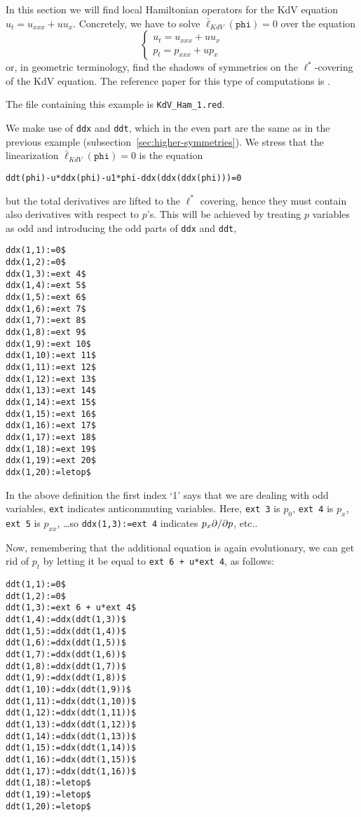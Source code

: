 In this section we will find local Hamiltonian operators for the KdV equation
$u_t=u_{xxx}+uu_x$. Concretely, we have to solve $\bar
\ell_{KdV}(\mathtt{phi})=0$ over the equation
\[
  \left\{\begin{array}{l}
    u_t=u_{xxx}+uu_x\\
    p_t=p_{xxx}+up_x
  \end{array}\right.
\]
or, in geometric terminology, find the shadows of symmetries on the
$\ell^*$-covering of the KdV equation. The reference paper for this type of
computations is \cite{KerstenKrasilshchikVerboretsky:2004}.

The file containing this example is \texttt{KdV\_Ham\_1.red}.

We make use of \texttt{ddx} and \texttt{ddt}, which in the even part are the
same as in the previous example (subsection~\ref{sec:higher-symmetries}).  We
stress that the linearization $\bar \ell_{KdV}(\mathtt{phi})=0$ is the equation
\begin{verbatim}
ddt(phi)-u*ddx(phi)-u1*phi-ddx(ddx(ddx(phi)))=0
\end{verbatim}
but the total derivatives are lifted to the $\ell^*$ covering, hence they must
contain also derivatives with respect to $p$'s. This will be achieved by
treating $p$ variables as odd and introducing the odd parts of \texttt{ddx} and
\texttt{ddt},
\begin{verbatim}
ddx(1,1):=0$
ddx(1,2):=0$
ddx(1,3):=ext 4$
ddx(1,4):=ext 5$
ddx(1,5):=ext 6$
ddx(1,6):=ext 7$
ddx(1,7):=ext 8$
ddx(1,8):=ext 9$
ddx(1,9):=ext 10$
ddx(1,10):=ext 11$
ddx(1,11):=ext 12$
ddx(1,12):=ext 13$
ddx(1,13):=ext 14$
ddx(1,14):=ext 15$
ddx(1,15):=ext 16$
ddx(1,16):=ext 17$
ddx(1,17):=ext 18$
ddx(1,18):=ext 19$
ddx(1,19):=ext 20$
ddx(1,20):=letop$
\end{verbatim}
In the above definition the first index `1' says that we are dealing with odd
variables, \texttt{ext} indicates anticommuting variables. Here, \texttt{ext 3}
is $p_0$, \texttt{ext 4} is $p_x$, \texttt{ext 5} is $p_{xx}$, \dots so
\texttt{ddx(1,3):=ext 4} indicates $p_x\pd{}{p}$, etc..

Now, remembering that the additional equation is again evolutionary, we can get
rid of $p_t$ by letting it be equal to \texttt{ext 6 + u*ext 4}, as follows:
\begin{verbatim}
ddt(1,1):=0$
ddt(1,2):=0$
ddt(1,3):=ext 6 + u*ext 4$
ddt(1,4):=ddx(ddt(1,3))$
ddt(1,5):=ddx(ddt(1,4))$
ddt(1,6):=ddx(ddt(1,5))$
ddt(1,7):=ddx(ddt(1,6))$
ddt(1,8):=ddx(ddt(1,7))$
ddt(1,9):=ddx(ddt(1,8))$
ddt(1,10):=ddx(ddt(1,9))$
ddt(1,11):=ddx(ddt(1,10))$
ddt(1,12):=ddx(ddt(1,11))$
ddt(1,13):=ddx(ddt(1,12))$
ddt(1,14):=ddx(ddt(1,13))$
ddt(1,15):=ddx(ddt(1,14))$
ddt(1,16):=ddx(ddt(1,15))$
ddt(1,17):=ddx(ddt(1,16))$
ddt(1,18):=letop$
ddt(1,19):=letop$
ddt(1,20):=letop$
\end{verbatim}

